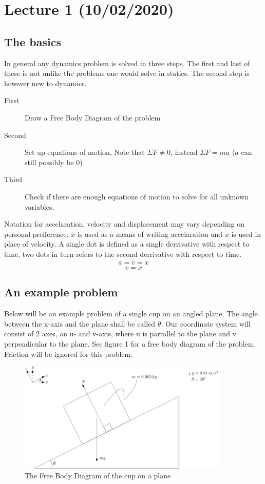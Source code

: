 \documentclass[11pt, a4paper]{article}
\begin{document}
\section{Lecture 1 (10/02/2020)}

\subsection{The basics}
In general any dynamics problem is solved in three steps. The first and last of these is not unlike the problems
one would solve in statics. The second step is however new to dynamics.
\begin{description}
    \item[First]  Draw a Free Body Diagram of the problem
    \item[Second] Set up equations of motion, Note that $\Sigma F \neq 0$, instead $\Sigma F = ma$ ($a$ can still possibly be 0)
    \item[Third]  Check if there are enough equations of motion to solve for all unknown variables.
\end{description}
Notation for accelaration, velocity and displacement may vary depending
on personal prefference. $\ddot{x}$ is used as a means of writing accelaration
and $\dot{x}$ is used in place of velocity. A single dot is defined as a single derrivative
with respect to time, two dots in turn refers to the second derrivative with respect to time.
\begin{equation*}
    a = \dot{v} = \ddot{x}
\end{equation*}
\begin{equation*}
    v = \dot{x}
\end{equation*}


\subsection{An example problem}
Below will be an example problem of a single cup on an angled plane. The angle between the x-axis
and the plane shall be called $\theta$. Our coordinate system will consist of 2 axes, an u- and v-axis, 
where u is parrallel to the plane and v perpendicular to the plane. See figure 1 for a free body diagram of
the problem. Friction will be ignored for this problem.

\begin{figure}[h]
    \centerline{\includegraphics[width=10cm]{images/Crate_No_Friction.png}}
    \caption{The Free Body Diagram of the cup on a plane}
\end{figure}
\end{document}
